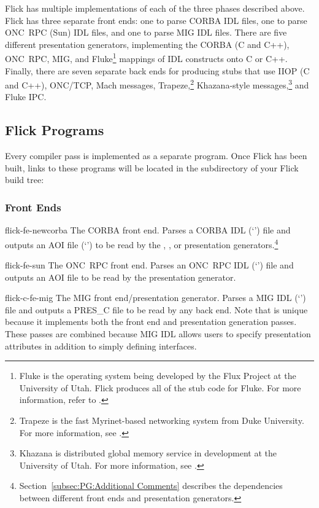 Flick has multiple implementations of each of the three phases described above.
Flick has three separate front ends: one to parse CORBA IDL files, one to parse
ONC~RPC (Sun) IDL files, and one to parse MIG IDL files.  There are five
different presentation generators, implementing the CORBA (C and C++), ONC~RPC,
MIG, and Fluke\footnote{Fluke is the operating system being developed by the
Flux Project at the University of Utah.  Flick produces all of the stub code
for Fluke.  For more information, refer to \flukeurl{}.} mappings of IDL
constructs onto C or C++\@.  Finally, there are seven separate back ends for
producing stubs that use IIOP (C and C++), ONC/TCP, Mach messages,
Trapeze,\footnote{Trapeze is the fast Myrinet-based networking system from Duke
University.  For more information, see \trapezeurl{}.}  Khazana-style
messages,\footnote{Khazana is distributed global memory service in development
at the University of Utah.  For more information, see \khazanaurl{}.}  and
Fluke IPC\@.



\subsection{Flick Programs}
\label{subsec:Flick Programs}

Every compiler pass is implemented as a separate program.  Once Flick has been
built, links to these programs will be located in the 
subdirectory of your Flick build tree:

\subsubsection{Front Ends}
\begin{commandlist}
  \item[flick-fe-newcorba] The CORBA front end.  Parses a CORBA IDL
  (`') file and outputs an AOI file (`') to be
  read by the , , or
   presentation
  generators.\footnote{Section~\ref{subsec:PG:Additional Comments} describes
  the dependencies between different front ends and presentation generators.}

  \item[flick-fe-sun] The ONC~RPC front end.  Parses an ONC~RPC IDL
  (`') file and outputs an AOI file to be read by the
   presentation generator.

  \item[flick-c-fe-mig] The MIG front end/presentation generator.  Parses a MIG
  IDL (`') file and outputs a PRES\_C file to be read by any
  back end.  Note that  is unique because it implements
  both the front end and presentation generation passes.  These passes are
  combined because MIG IDL allows users to specify presentation attributes in
  addition to simply defining interfaces.
\end{commandlist}

